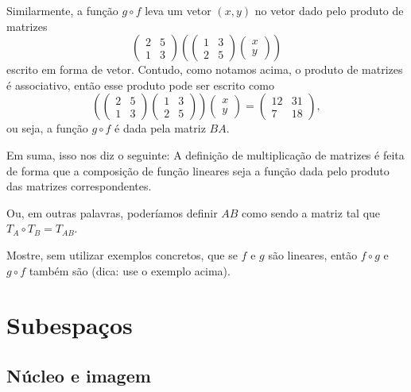 \begin{ex}
	Similarmente, a função $g\circ f$ leva um vetor $(x,y)$ no vetor dado pelo produto de matrizes
	\[\begin{pmatrix}
	2&5\\
	1&3
	\end{pmatrix}\left(\begin{pmatrix}
	1&3\\
	2&5
	\end{pmatrix}\begin{pmatrix}
	x\\y
	\end{pmatrix}\right)\]escrito em forma de vetor. Contudo, como notamos acima, o produto de matrizes é associativo, então esse produto pode ser escrito como
	\[\left(\begin{pmatrix}
	2&5\\
	1&3
	\end{pmatrix}\begin{pmatrix}
	1&3\\
	2&5
	\end{pmatrix}\right)\begin{pmatrix}
	x\\y
	\end{pmatrix}=\begin{pmatrix}
	12 & 31\\7&18
	\end{pmatrix},\]ou seja, a função $g\circ f$ é dada pela matriz $BA$.
	
	
	Em suma, isso nos diz o seguinte: A definição de multiplicação de matrizes é feita de forma que a composição de função lineares seja a função dada pelo produto das matrizes correspondentes.
	
	Ou, em outras palavras, poderíamos definir $AB$ como sendo a matriz tal que $T_A\circ T_B=T_{AB}$.
\end{ex}

\begin{exerc}
	Mostre, sem utilizar exemplos concretos, que se $f$ e $g$ são lineares, então $f\circ g$ e $g\circ f$ também são (dica: use o exemplo acima).
\end{exerc}

\section{Subespaços}
\subsection{Núcleo e imagem}

